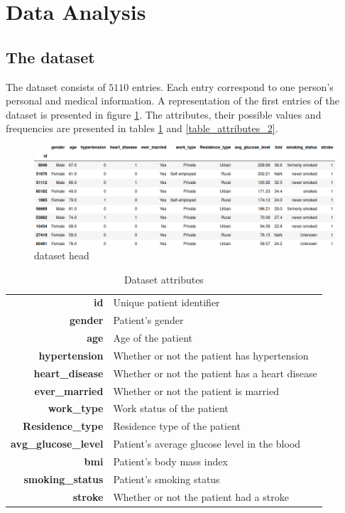 \section{Data Analysis}

\subsection{The dataset}
The dataset consists of $5110$ entries. Each entry correspond to one person's personal and medical 
information. A representation of the first entries of the dataset is presented in figure 
\ref{dataset_head}. The attributes, their possible values and frequencies are presented in tables 
\ref{table_attributes_1} and \ref{table_attributes_2}.


\begin{figure}[H]
\centering
\includegraphics[scale=0.5]{figures/dataset_head.png}
\caption{dataset head}
\label{dataset_head}
\end{figure}

\begin{table}[H]\begin{tabular}{rm{11cm}}
 \textbf{id} & Unique patient identifier\\
 \textbf{gender} & Patient's gender\\
 \textbf{age} & Age of the patient\\
 \textbf{hypertension}   & Whether or not the patient has hypertension\\
 \textbf{heart\_disease} & Whether or not the patient has a heart disease\\
 \textbf{ever\_married} & Whether or not the patient is married\\
 \textbf{work\_type} & Work status of the patient\\
 \textbf{Residence\_type} & Residence type of the patient\\
 \textbf{avg\_glucose\_level} & Patient's average glucose level in the blood\\
 \textbf{bmi} & Patient's body mass index\\
 \textbf{smoking\_status} & Patient's smoking status\\
 \textbf{stroke} & Whether or not the patient had a stroke
\end{tabular}
\caption{Dataset attributes}
\label{table_attributes_1}
\end{table}

